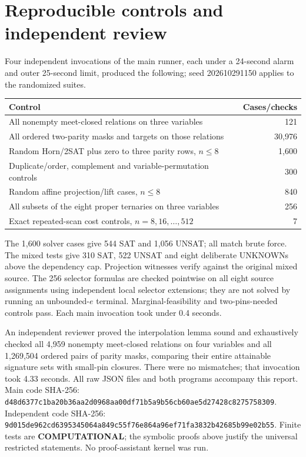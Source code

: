 \documentclass[11pt]{article}
\begin{document}
\section{Reproducible controls and independent review}
Four independent invocations of the main runner, each under a 24-second
alarm and outer 25-second limit, produced the following; seed 202610291150
applies to the randomized suites.
\begin{center}\begin{tabular}{lr}\toprule
Control & Cases/checks\\\midrule
All nonempty meet-closed relations on three variables & 121\\
All ordered two-parity masks and targets on those relations & 30,976\\
Random Horn/2SAT plus zero to three parity rows, $n\le8$ & 1,600\\
Duplicate/order, complement and variable-permutation controls & 300\\
Random affine projection/lift cases, $n\le8$ & 840\\
All subsets of the eight proper ternaries on three variables & 256\\
Exact repeated-scan cost controls, $n=8,16,\ldots,512$ & 7\\\bottomrule
\end{tabular}\end{center}
The 1,600 solver cases give 544 SAT and 1,056 UNSAT; all match brute force.
The mixed tests give 310 SAT, 522 UNSAT and eight deliberate UNKNOWNs above
the dependency cap. Projection witnesses verify against the original mixed
source. The 256 selector formulas are checked pointwise on all eight source
assignments using independent local selector extensions; they are not
solved by running an unbounded-$e$ terminal. Marginal-feasibility and
two-pins-needed controls pass. Each main invocation took under 0.4 seconds.

An independent reviewer proved the interpolation lemma sound and exhaustively
checked all 4,959 nonempty meet-closed relations on four variables and all
1,269,504 ordered pairs of parity masks, comparing their entire attainable
signature sets with small-pin closures. There were no mismatches; that
invocation took 4.33 seconds. All raw JSON files and both programs accompany
this report. Main code SHA-256:
\texttt{d48d6377c1ba20b36aa2d0968aa00df71b5a9b56cb60ae5d27428c8275758309}.
Independent code SHA-256:
\texttt{9d015de962cd6395345064a849c55f76e864a96ef71fa3832b42685b99e02b55}.
Finite tests are \textbf{COMPUTATIONAL}; the symbolic proofs above justify
the universal restricted statements. No proof-assistant kernel was run.
\end{document}
